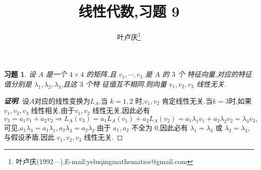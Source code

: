 ﻿\documentclass[a4paper]{article}
\newtheorem*{exe}{习题}
\newenvironment{exercise}
{\bigskip\begin{mdframed}\begin{exe}}
    {\end{exe}\end{mdframed}\bigskip}
\begin{document}
\title{\huge{\bf{线性代数,习题 9}}} \author{\small{叶卢庆\footnote{叶卢庆(1992---),E-mail:yeluqingmathematics@gmail.com}}}
\maketitle
\begin{exercise}
设 $A$ 是一个 $4\times 4$ 的矩阵,且 $v_1,\cdots,v_3$ 是 $A$ 的 $3$ 个
特征向量,对应的特征值分别是 $\lambda_1,\lambda_{2},\lambda_3$,且这 $3$ 个特
征值互不相同.则向量 $v_1,v_{2},v_3$ 线性无关.
\end{exercise}
\begin{proof}[\textbf{证明}]
设$A$对应的线性变换为$L_A$.当 $k=1,2$ 时,$v_1,v_2$ 肯定线性无关.当$k=3$时,如果
$v_1,v_2,v_3$ 线性相关,由于$v_1,v_2$ 线性无关,因此必有
$$
v_3=a_1v_1+a_2v_2\Rightarrow L_A(v_3)=a_1L_A(v_1)+a_2L_A(v_2)=a_1\lambda_1v_1+a_2\lambda_2v_2=\lambda_3v_3,
$$
可见,$a_1\lambda_3=a_1\lambda_1,a_2\lambda_3=a_2\lambda_2$.由于
$a_1,a_2$ 不全为 $0$,因此必有 $\lambda_1=\lambda_3$ 或
$\lambda_2=\lambda_3$,与假设矛盾.因此 $v_1,v_2,v_3$ 线性无关.
\end{proof}
\end{document}
